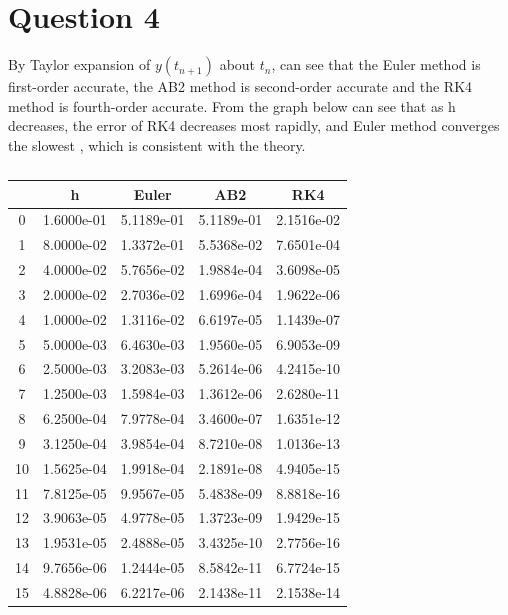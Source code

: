 \documentclass[11pt]{article}
\begin{document}
\section*{Question 4}
By Taylor expansion of $y(t_{n+1})$ about $t_{n}$, can see that the Euler method is first-order accurate, the AB2 method is second-order accurate and the RK4 method is fourth-order accurate.
From the graph below can see that as h decreases, the error of RK4 decreases most rapidly, and Euler method converges the slowest , which is consistent with the theory.
\begin{table}[htb]                            
\centering                               
\begin{tabular}{|c|c|c|c|c|}             
\hline                                   
 & h & Euler & AB2 & RK4 \\                      
\hline                                   
0 & 1.6000e-01 & 5.1189e-01 & 5.1189e-01 & 2.1516e-02 \\ 
\hline                                   
1 & 8.0000e-02 & 1.3372e-01 & 5.5368e-02 & 7.6501e-04 \\ 
\hline                                   
2 & 4.0000e-02 & 5.7656e-02 & 1.9884e-04 & 3.6098e-05 \\ 
\hline                                   
3 & 2.0000e-02 & 2.7036e-02 & 1.6996e-04 & 1.9622e-06 \\ 
\hline                                   
4 & 1.0000e-02 & 1.3116e-02 & 6.6197e-05 & 1.1439e-07 \\ 
\hline                                   
5 & 5.0000e-03 & 6.4630e-03 & 1.9560e-05 & 6.9053e-09 \\ 
\hline                                   
6 & 2.5000e-03 & 3.2083e-03 & 5.2614e-06 & 4.2415e-10 \\ 
\hline                                   
7 & 1.2500e-03 & 1.5984e-03 & 1.3612e-06 & 2.6280e-11 \\ 
\hline                                   
8 & 6.2500e-04 & 7.9778e-04 & 3.4600e-07 & 1.6351e-12 \\ 
\hline                                   
9 & 3.1250e-04 & 3.9854e-04 & 8.7210e-08 & 1.0136e-13 \\ 
\hline                                   
10 & 1.5625e-04 & 1.9918e-04 & 2.1891e-08 & 4.9405e-15 \\
\hline                                   
11 & 7.8125e-05 & 9.9567e-05 & 5.4838e-09 & 8.8818e-16 \\
\hline                                   
12 & 3.9063e-05& 4.9778e-05 & 1.3723e-09 & 1.9429e-15 \\
\hline                                   
13 & 1.9531e-05 & 2.4888e-05 & 3.4325e-10 & 2.7756e-16 \\
\hline                                   
14 & 9.7656e-06 & 1.2444e-05 & 8.5842e-11 & 6.7724e-15 \\
\hline                                   
15 & 4.8828e-06 & 6.2217e-06 & 2.1438e-11 & 2.1538e-14\\
\hline                                   
\end{tabular}                            
\caption{}                 
\label{table:MyTableLabel}               
\end{table}                   
\end{document}
